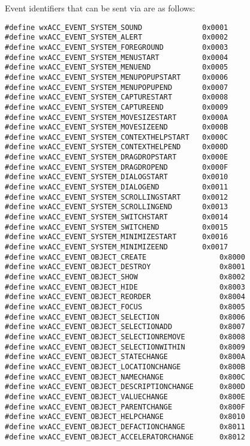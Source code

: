 Event identifiers that can be sent via  are
as follows:

{\small 
\begin{verbatim}
#define wxACC_EVENT_SYSTEM_SOUND              0x0001
#define wxACC_EVENT_SYSTEM_ALERT              0x0002
#define wxACC_EVENT_SYSTEM_FOREGROUND         0x0003
#define wxACC_EVENT_SYSTEM_MENUSTART          0x0004
#define wxACC_EVENT_SYSTEM_MENUEND            0x0005
#define wxACC_EVENT_SYSTEM_MENUPOPUPSTART     0x0006
#define wxACC_EVENT_SYSTEM_MENUPOPUPEND       0x0007
#define wxACC_EVENT_SYSTEM_CAPTURESTART       0x0008
#define wxACC_EVENT_SYSTEM_CAPTUREEND         0x0009
#define wxACC_EVENT_SYSTEM_MOVESIZESTART      0x000A
#define wxACC_EVENT_SYSTEM_MOVESIZEEND        0x000B
#define wxACC_EVENT_SYSTEM_CONTEXTHELPSTART   0x000C
#define wxACC_EVENT_SYSTEM_CONTEXTHELPEND     0x000D
#define wxACC_EVENT_SYSTEM_DRAGDROPSTART      0x000E
#define wxACC_EVENT_SYSTEM_DRAGDROPEND        0x000F
#define wxACC_EVENT_SYSTEM_DIALOGSTART        0x0010
#define wxACC_EVENT_SYSTEM_DIALOGEND          0x0011
#define wxACC_EVENT_SYSTEM_SCROLLINGSTART     0x0012
#define wxACC_EVENT_SYSTEM_SCROLLINGEND       0x0013
#define wxACC_EVENT_SYSTEM_SWITCHSTART        0x0014
#define wxACC_EVENT_SYSTEM_SWITCHEND          0x0015
#define wxACC_EVENT_SYSTEM_MINIMIZESTART      0x0016
#define wxACC_EVENT_SYSTEM_MINIMIZEEND        0x0017
#define wxACC_EVENT_OBJECT_CREATE                 0x8000
#define wxACC_EVENT_OBJECT_DESTROY                0x8001
#define wxACC_EVENT_OBJECT_SHOW                   0x8002
#define wxACC_EVENT_OBJECT_HIDE                   0x8003
#define wxACC_EVENT_OBJECT_REORDER                0x8004
#define wxACC_EVENT_OBJECT_FOCUS                  0x8005
#define wxACC_EVENT_OBJECT_SELECTION              0x8006
#define wxACC_EVENT_OBJECT_SELECTIONADD           0x8007
#define wxACC_EVENT_OBJECT_SELECTIONREMOVE        0x8008
#define wxACC_EVENT_OBJECT_SELECTIONWITHIN        0x8009
#define wxACC_EVENT_OBJECT_STATECHANGE            0x800A
#define wxACC_EVENT_OBJECT_LOCATIONCHANGE         0x800B
#define wxACC_EVENT_OBJECT_NAMECHANGE             0x800C
#define wxACC_EVENT_OBJECT_DESCRIPTIONCHANGE      0x800D
#define wxACC_EVENT_OBJECT_VALUECHANGE            0x800E
#define wxACC_EVENT_OBJECT_PARENTCHANGE           0x800F
#define wxACC_EVENT_OBJECT_HELPCHANGE             0x8010
#define wxACC_EVENT_OBJECT_DEFACTIONCHANGE        0x8011
#define wxACC_EVENT_OBJECT_ACCELERATORCHANGE      0x8012
\end{verbatim}
}

